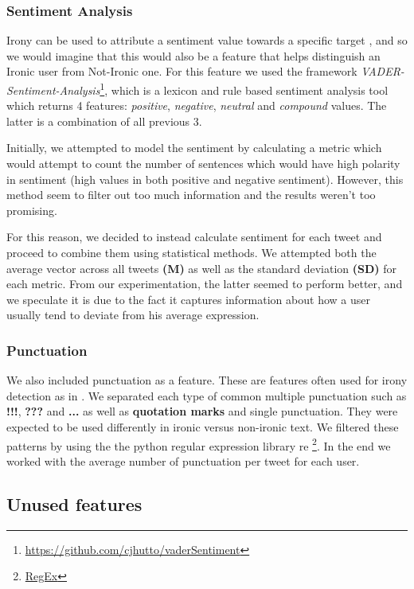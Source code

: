     \subsubsection{Sentiment Analysis}
        Irony can be used to attribute a sentiment value towards a specific target \cite{irony_detect_twitter}, and so we would imagine that this would also be a feature that helps distinguish an Ironic user from Not-Ironic one.
        For this feature we used the framework \emph{VADER-Sentiment-Analysis}\footnote{\url{https://github.com/cjhutto/vaderSentiment}}, which is a lexicon and rule based sentiment analysis tool which returns 4 features: \emph{positive}, \emph{negative}, \emph{neutral} and \emph{compound} values. The latter is a combination of all previous 3. 
        
        Initially, we attempted to model the sentiment by calculating a metric which would attempt to count the number of sentences which would have high polarity in sentiment (high values in both positive and negative sentiment). However, this method seem to filter out too much information and the results weren't too promising.
        
        For this reason, we decided to instead calculate sentiment for each tweet and proceed to combine them using statistical methods. We attempted both the average vector across all tweets \textbf{(M)} as well as the standard deviation \textbf{(SD)} for each metric. From our experimentation, the latter seemed to perform better, and we speculate it is due to the fact it captures information about how a user usually tend to deviate from his average expression. 
        
    \subsubsection{Punctuation}
    We also included punctuation as a feature. These are features often used for irony detection as in \cite{Pathways_punct}. We separated each type of common multiple punctuation such as \textbf{!!!}, \textbf{???} and \textbf{...} as well as \textbf{quotation marks} and single punctuation. They were expected to be used differently in ironic versus non-ironic text. We filtered these patterns by using the the python regular expression library re \footnote{\href{https://docs.python.org/3/library/re.html}{RegEx}}. In the end we worked with the average number of punctuation per tweet for each user.
    
    
\subsection{Unused features}

